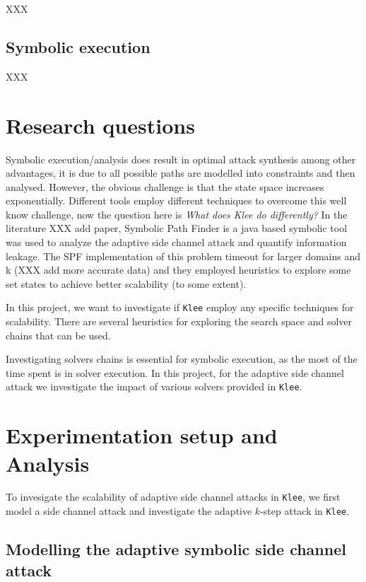 \documentclass[11pt,a4paper,notitlepage]{article}
\begin{document}
XXX 

\subsection{Symbolic execution}
\label{sec:symbolicexecution}

XXX

\newpage

\section{Research questions}
\label{sec:researchquestions}

Symbolic execution/analysis does result in optimal attack synthesis among other advantages, it is due to all possible paths are modelled into constraints and then analysed.
However, the obvious challenge is that the state space increases exponentially.
Different tools employ different techniques to overcome this well know challenge, now the question here is \emph{What does Klee do differently?}
In the literature XXX add paper, Symbolic Path Finder is a java based symbolic tool was used to analyze the adaptive side channel attack and quantify information leakage.
The SPF implementation of this problem timeout for larger domains and k (XXX add more accurate data) and they employed heuristics to explore some set states to achieve better scalability (to some extent).

In this project, we want to investigate if \texttt{Klee} employ any specific techniques for scalability.
There are several heuristics for exploring the search space and solver chains that can be used.

Investigating solvers chains is essential for symbolic execution, as the most of the time spent is in solver execution.
In this project, for the adaptive side channel attack we investigate the impact of various solvers provided in \texttt{Klee}.

\newpage

\section{Experimentation setup and Analysis}
\label{sec:experimentationanddesign}

To invesigate the scalability of adaptive side channel attacks in \texttt{Klee}, we first model a side channel attack and investigate the adaptive $k$-step attack in \texttt{Klee}.

\subsection{Modelling the adaptive symbolic side channel attack}
\label{subsec:modellingsscattack}
\end{document}
